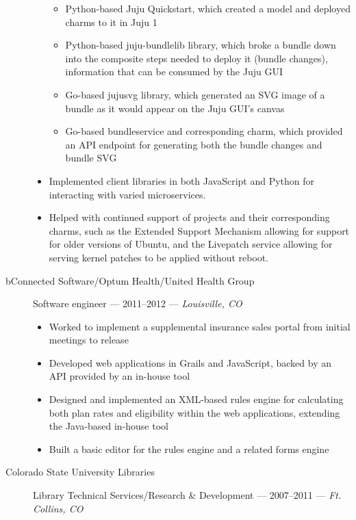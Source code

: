\begin{description}
\begin{itemize}
        \begin{itemize}
            \tightlist
            \item
            Python-based Juju Quickstart, which created a model and deployed charms to it in Juju 1
            \item
            Python-based juju-bundlelib library, which broke a bundle down into the composite steps needed to deploy it (bundle changes), information that can be consumed by the Juju GUI
            \item
            Go-based jujusvg library, which generated an SVG image of a bundle as it would appear on the Juju GUI's canvas
            \item
            Go-based bundleservice and corresponding charm, which provided an API endpoint for generating both the bundle changes and bundle SVG
        \end{itemize}
        \item
        Implemented client libraries in both JavaScript and Python for interacting with varied microservices.
        \item
        Helped with continued support of projects and their corresponding charms, such as the Extended Support Mechanism allowing for support for older versions of Ubuntu, and the Livepatch service allowing for serving kernel patches to be applied without reboot.
    \end{itemize}
    \item[bConnected Software/Optum Health/United Health Group]
    Software engineer --- 2011--2012 --- \emph{Louisville, CO}

    \begin{itemize}
        \tightlist
        \item
        Worked to implement a supplemental insurance sales portal from initial meetings to release
        \item
        Developed web applications in Grails and JavaScript, backed by an API provided by an in-house tool
        \item
        Designed and implemented an XML-based rules engine for calculating both plan rates and eligibility within the web applications, extending the Java-based in-house tool
        \item
        Built a basic editor for the rules engine and a related forms engine
    \end{itemize}
    \item[Colorado State University Libraries]
    Library Technical Services/Research \& Development --- 2007--2011 --- \emph{Ft. Collins, CO}


\end{description}
